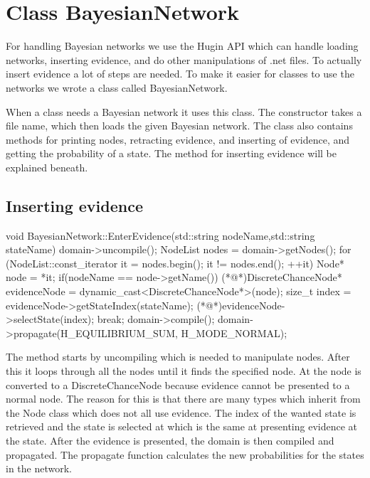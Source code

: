 \section{Class BayesianNetwork}
	For handling Bayesian networks we use the Hugin API which can handle loading networks, inserting evidence, and do other manipulations of .net files. To actually 
	insert evidence a lot of steps are needed. To make it easier for classes to use the networks we wrote a class called BayesianNetwork.

	When a class needs a Bayesian network it uses this class. The constructor takes a file name, which then loads the given 
	Bayesian network. The class also contains methods for printing nodes, retracting evidence, and inserting of evidence, and getting the probability of a state. 
	The method for inserting evidence will be explained beneath.
	\subsection*{Inserting evidence}
		\begin{Sourcecode}[caption=EnterEvidence method]
void BayesianNetwork::EnterEvidence(std::string nodeName,std::string stateName){
domain->uncompile();
NodeList nodes = domain->getNodes();
for (NodeList::const_iterator it = nodes.begin(); it != nodes.end(); ++it)
{
	Node* node = *it;
	if(nodeName == node->getName())
	{
		(*@\lnote@*)DiscreteChanceNode* evidenceNode = dynamic_cast<DiscreteChanceNode*>(node);
		size_t index = evidenceNode->getStateIndex(stateName);
		(*@\lnote@*)evidenceNode->selectState(index);
		break;
	}
}
domain->compile();
domain->propagate(H_EQUILIBRIUM_SUM, H_MODE_NORMAL);
}
		\end{Sourcecode}
		The method starts by uncompiling which is needed to manipulate nodes. After this it loops through all the nodes until it finds the specified 
		node. At  the node is converted to a DiscreteChanceNode because evidence cannot be presented to a normal node. The reason for this 
		is that there are many types which inherit from the Node class which does not all use evidence. The index of the wanted state is	retrieved and the state is selected at  which is the same at presenting evidence at the state. After the evidence is presented, the 
		domain is then compiled and propagated. The propagate function calculates the new probabilities for the states in the network.